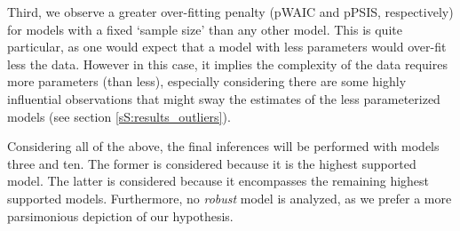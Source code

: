 Third, we observe a greater over-fitting penalty (pWAIC and pPSIS, respectively) for models with a fixed `sample size' than any other model. This is quite particular, as one would expect that a model with less parameters would over-fit less the data. However in this case, it implies the complexity of the data requires more parameters (than less), especially considering there are some highly influential observations that might sway the estimates of the less parameterized models (see section \ref{sS:results_outliers}). 

Considering all of the above, the final inferences will be performed with models three and ten. The former is considered because it is the highest supported model. The latter is considered because it encompasses the remaining highest supported models. Furthermore, no \textit{robust} model is analyzed, as we prefer a more parsimonious depiction of our hypothesis.
%
